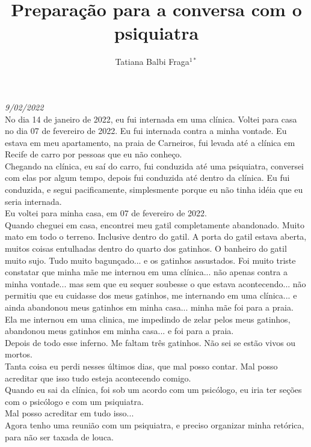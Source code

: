 \documentclass{book}
\title{Preparação para a conversa com o psiquiatra}
\author{Tatiana Balbi Fraga$^{1*}$}
\begin{document}
\emph{9/02/2022}  \\

No dia 14 de janeiro de 2022, eu fui internada em uma clínica. Voltei para casa no dia 07 de fevereiro de 2022. Eu fui internada contra a minha vontade. Eu estava em meu apartamento, na praia de Carneiros, fui levada até a clínica em Recife de carro por pessoas que eu não conheço. \\

Chegando na clínica, eu saí do carro, fui conduzida até uma psiquiatra, conversei com elas por algum tempo, depois fui conduzida até dentro da clínica. Eu fui conduzida, e segui pacificamente, simplesmente porque eu não tinha idéia que eu seria internada. \\

Eu voltei para minha casa, em 07 de fevereiro de 2022. \\

Quando cheguei em casa, encontrei meu gatil completamente abandonado. Muito mato em todo o terreno. Inclusive dentro do gatil. A porta do gatil estava aberta, muitos coisas entulhadas dentro do quarto dos gatinhos. O banheiro do gatil muito sujo. Tudo muito bagunçado... e os gatinhos assustados. Foi muito triste constatar que minha mãe me internou em uma clínica... não apenas contra a minha vontade... mas sem que eu sequer soubesse o que estava acontecendo... não permitiu que eu cuidasse dos meus gatinhos, me internando em uma clínica... e ainda abandonou meus gatinhos em minha casa... minha mãe foi para a praia. \\

Ela me internou em uma clinica, me impedindo de zelar pelos meus gatinhos, abandonou meus gatinhos em minha casa... e foi para a praia.\\

Depois de todo esse inferno. Me faltam três gatinhos. Não sei se estão vivos ou mortos. \\

Tanta coisa eu perdi nesses últimos dias, que mal posso contar. Mal posso acreditar que isso tudo esteja acontecendo comigo. \\

Quando eu sai da clínica, foi sob um acordo com um psicólogo, eu iria ter seções com o psicólogo e com um psiquiatra.\\

Mal posso acreditar em tudo isso... \\

Agora tenho uma reunião com um psiquiatra, e preciso organizar minha retórica, para não ser taxada de louca. \\
\end{document}
